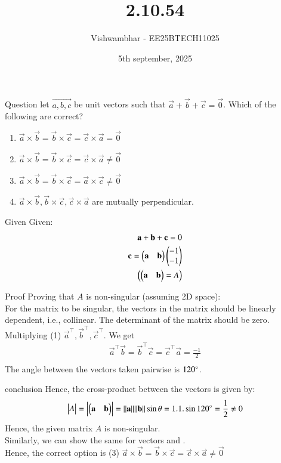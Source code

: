 \documentclass{beamer}
\title{2.10.54}
\date{5th september, 2025}
\author{Vishwambhar - EE25BTECH11025}
\begin{document}
\frame{\titlepage}
\begin{frame}{Question}
let $\vec{a, b,c}$ be unit vectors such that $\vec{a}+\vec{b}+\vec{c}=\vec{0}$. Which of the following are correct?\\
\begin{enumerate}
    \item $\vec{a}\times \vec{b}=\vec{b}\times \vec{c}=\vec{c}\times \vec{a}=\vec{0}$
    \item $\vec{a}\times \vec{b}=\vec{b}\times \vec{c}=\vec{c}\times \vec{a}\neq \vec{0}$
    \item $\vec{a}\times \vec{b}=\vec{b}\times \vec{c}=\vec{a}\times \vec{c}\neq \vec{0}$
    \item $\vec{a}\times \vec{b},\vec{b}\times \vec{c}, \vec{c}\times \vec{a}$ are mutually perpendicular.
\end{enumerate}
\end{frame}

\begin{frame}{Given}
Given:
\begin{align}
    \mathbf{a}+\mathbf{b}+\mathbf{c}=0\\
    \mathbf{c}= \begin{pmatrix}\mathbf{a}&\mathbf{b}\end{pmatrix}\begin{pmatrix}-1\\-1\end{pmatrix}\\
    \left(\begin{pmatrix}\mathbf{a}&\mathbf{b}\end{pmatrix}=A\right)
\end{align}
\end{frame}

\begin{frame}{Proof}
Proving that $A$ is non-singular (assuming 2D space):\\

For the matrix to be singular, the vectors in the matrix should be linearly dependent, i.e., collinear. The determinant of the matrix should be zero.\\
Multiplying (1) $\vec{a}^\top, \vec{b}^\top, \vec{c}^\top$. We get
\begin{align}
    \vec{a}^\top\vec{b}=\vec{b}^\top\vec{c}=\vec{c}^\top\vec{a}=\frac{-1}{2}\\
\end{align}
The angle between the vectors taken pairwise is $120\degree$. 
\end{frame}

\begin{frame}{conclusion}
Hence, the cross-product between the vectors is given by:
\begin{align}
    \mdet{A}=\mdet{\myvec{\vec{a}&\vec{b}}}=||\vec{a}||||\vec{b}||\sin\theta=1.1.\sin120\degree=\frac{1}{2}\neq0
\end{align}
Hence, the given matrix $A$ is non-singular.\\

Similarly, we can show the same for vectors  and .\\
Hence, the correct option is (3) $\vec{a}\times \vec{b}=\vec{b}\times \vec{c}=\vec{c}\times \vec{a}\neq \vec{0}$
\end{frame}
\end{document}
